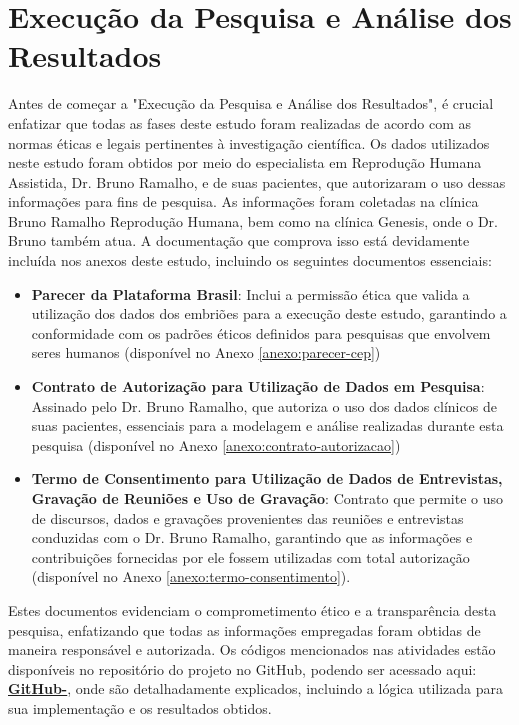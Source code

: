 
\chapter[Execução da Pesquisa e Análise dos Resultados]{Execução da Pesquisa e Análise dos Resultados} 

Antes de começar a "Execução da Pesquisa e Análise dos Resultados", é crucial enfatizar que todas as fases deste estudo foram realizadas de acordo com as normas éticas e legais pertinentes à investigação científica. Os dados utilizados neste estudo foram obtidos por meio do especialista em Reprodução Humana Assistida, Dr. Bruno Ramalho, e de suas pacientes, que autorizaram o uso dessas informações para fins de pesquisa. As informações foram coletadas na clínica Bruno Ramalho Reprodução Humana, bem como na clínica Genesis, onde o Dr. Bruno também atua. A documentação que comprova isso está devidamente incluída nos anexos deste estudo, incluindo os seguintes documentos essenciais:
\begin{itemize}
  \item \textbf{Parecer da Plataforma Brasil}: Inclui a permissão ética que valida a utilização dos dados dos embriões para a execução deste estudo, garantindo a conformidade com os padrões éticos definidos para pesquisas que envolvem seres humanos (disponível no Anexo \ref{anexo:parecer-cep})
  \item \textbf{Contrato de Autorização para Utilização de Dados em Pesquisa}: Assinado pelo Dr. Bruno Ramalho, que autoriza o uso dos dados clínicos de suas pacientes, essenciais para a modelagem e análise realizadas durante esta pesquisa (disponível no Anexo \ref{anexo:contrato-autorizacao})
  \item \textbf{Termo de Consentimento para Utilização de Dados de Entrevistas, Gravação de Reuniões e Uso de Gravação}: Contrato que permite o uso de discursos, dados e gravações provenientes das reuniões e entrevistas conduzidas com o Dr. Bruno Ramalho, garantindo que as informações e contribuições fornecidas por ele fossem utilizadas com total autorização (disponível no Anexo \ref{anexo:termo-consentimento}).
\end{itemize}
Estes documentos evidenciam o comprometimento ético e a transparência desta pesquisa, enfatizando que todas as informações empregadas foram obtidas de maneira responsável e autorizada.
Os códigos mencionados nas atividades estão disponíveis no repositório do projeto no GitHub, podendo ser acessado aqui: \textbf{\href{https://github.com/sabrinaberno/TCC}{GitHub-}}, onde são detalhadamente explicados, incluindo a lógica utilizada para sua implementação e os resultados obtidos.
 
